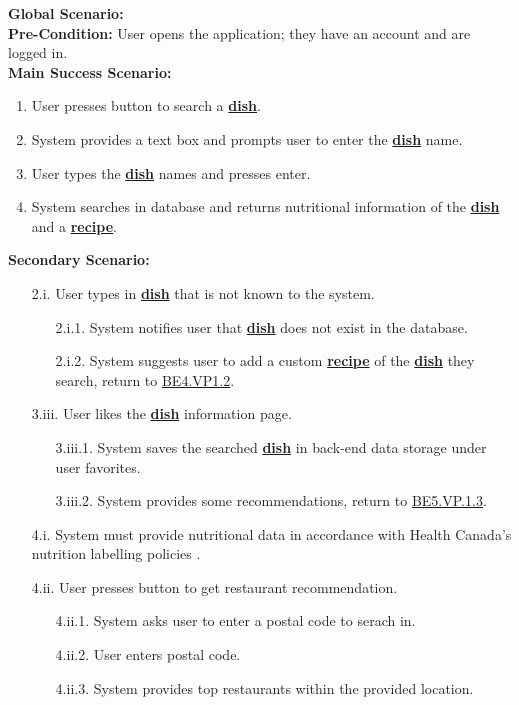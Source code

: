 \documentclass[]{article}
\begin{document}
\begin{enumerate}[{\bf BE1.}]
		{\bf Global Scenario:} \\
		\textbf{Pre-Condition:} User opens the application; they have an account and are logged in. \\
		\textbf{Main Success Scenario:} 
		\begin{enumerate}[{1.}]
			\item User presses button to search a \hyperref[Dish]{\textbf{dish}}.
			\item System provides a text box and prompts user to enter the \hyperref[Dish]{\textbf{dish}} name.
			\item User types the \hyperref[Dish]{\textbf{dish}} names and presses enter.
			\item System searches in database and returns nutritional information of the \hyperref[Dish]{\textbf{dish}} and a \hyperref[Recipe]{\textbf{recipe}}.
		\end{enumerate}
		\textbf{Secondary Scenario:}
		\begin{enumerate}
			\item[2.i.] User types in \hyperref[Dish]{\textbf{dish}} that is not known to the system.
			\begin{enumerate}
				\item[2.i.1.] System notifies user that \hyperref[Dish]{\textbf{dish}} does not exist in the database.
				\item[2.i.2.] System suggests user to add a custom \hyperref[Recipe]{\textbf{recipe}} of the \hyperref[Dish]{\textbf{dish}} they search, return to \hyperlink{BE4.VP1.2}{BE4.VP1.2}.
			\end{enumerate}
			\item[3.iii.] User likes the \hyperref[Dish]{\textbf{dish}} information page.
				\begin{enumerate}
					\item[3.iii.1.] System saves the searched \hyperref[Dish]{\textbf{dish}} in back-end data storage under user favorites.
					\item[3.iii.2.] System provides some recommendations, return to \hyperlink{BE5.VP.1.3}{BE5.VP.1.3}.
				\end{enumerate}
			\item[4.i.] System must provide nutritional data in accordance with Health Canada's nutrition labelling policies \cite{CanadaNutrition}.
			\item[4.ii.] User presses button to get restaurant recommendation.
				\begin{enumerate}
					\item[4.ii.1.] System asks user to enter a postal code to serach in.
					\item[4.ii.2.] User enters postal code.
					\item[4.ii.3.] System provides top restaurants within the provided location.
				\end{enumerate}
		\end{enumerate}


\end{enumerate}
\end{document}
